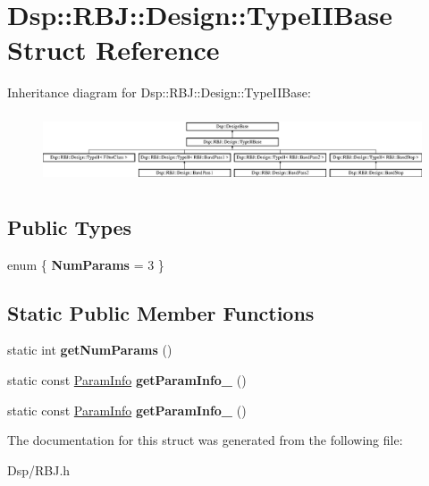 \hypertarget{structDsp_1_1RBJ_1_1Design_1_1TypeIIBase}{\section{Dsp\-:\-:R\-B\-J\-:\-:Design\-:\-:Type\-I\-I\-Base Struct Reference}
\label{structDsp_1_1RBJ_1_1Design_1_1TypeIIBase}
}
Inheritance diagram for Dsp\-:\-:R\-B\-J\-:\-:Design\-:\-:Type\-I\-I\-Base\-:\begin{figure}[H]
\begin{center}
\leavevmode
\includegraphics[height=2.058824cm]{structDsp_1_1RBJ_1_1Design_1_1TypeIIBase}
\end{center}
\end{figure}
\subsection*{Public Types}
\begin{DoxyCompactItemize}
\item 
enum \{ {\bfseries Num\-Params} =  3
 \}
\end{DoxyCompactItemize}
\subsection*{Static Public Member Functions}
\begin{DoxyCompactItemize}
\item 
\hypertarget{structDsp_1_1RBJ_1_1Design_1_1TypeIIBase_af90055918c6aa26355968c0311ad40d7}{static int {\bfseries get\-Num\-Params} ()}\label{structDsp_1_1RBJ_1_1Design_1_1TypeIIBase_af90055918c6aa26355968c0311ad40d7}

\item 
\hypertarget{structDsp_1_1RBJ_1_1Design_1_1TypeIIBase_a4605b4e26739e6e655ed1ddf2fc492d6}{static const \hyperlink{classDsp_1_1ParamInfo}{Param\-Info} {\bfseries get\-Param\-Info\-\_} ()}\label{structDsp_1_1RBJ_1_1Design_1_1TypeIIBase_a4605b4e26739e6e655ed1ddf2fc492d6}

\item 
\hypertarget{structDsp_1_1RBJ_1_1Design_1_1TypeIIBase_a60be95131f87863b72eaf56b31b52a71}{static const \hyperlink{classDsp_1_1ParamInfo}{Param\-Info} {\bfseries get\-Param\-Info\-\_} ()}\label{structDsp_1_1RBJ_1_1Design_1_1TypeIIBase_a60be95131f87863b72eaf56b31b52a71}

\end{DoxyCompactItemize}


The documentation for this struct was generated from the following file\-:\begin{DoxyCompactItemize}
\item 
Dsp/R\-B\-J.\-h\end{DoxyCompactItemize}
